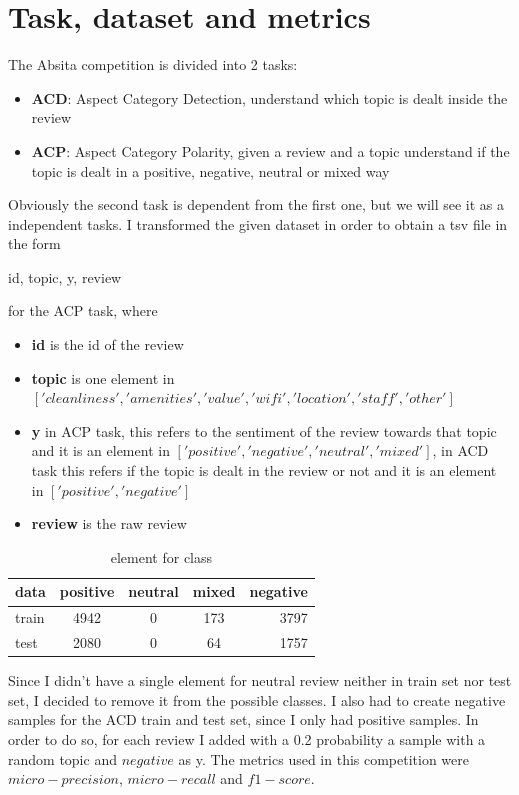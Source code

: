 \documentclass{article}
\begin{document}
    \section{Task, dataset and metrics}\label{sec:s1}
        The Absita competition is divided into 2 tasks:
        \begin{itemize}
            \item \textbf{ACD}: Aspect Category Detection, understand which topic is dealt inside the review
            \item \textbf{ACP}: Aspect Category Polarity, given a review and a topic understand if the topic is dealt in a positive, negative, neutral or mixed way
        \end{itemize}
        Obviously the second task is dependent from the first one, but we will see it as a independent tasks.
        I transformed the given dataset in order to obtain a tsv file in the form
        \\\centerline{id, topic, y, review}
        for the ACP task, where
        \begin{itemize}
            \item \textbf{id} is the id of the review
            \item \textbf{topic} is one element in $['cleanliness', 'amenities', 'value', 'wifi', 'location', 'staff', 'other']$
            \item \textbf{y} in ACP task, this refers to the sentiment of the review towards that topic and it is an element in $['positive', 'negative', 'neutral', 'mixed']$, in ACD task this refers if the topic is dealt in the review or not and it is an element in $['positive', 'negative']$
            \item \textbf{review} is the raw review
        \end{itemize}
        \begin{table}[h!]
            \begin{center}
                \caption{element for class}
                \label{tab:table1}
                \begin{tabular}{l|c|c|c|r}
                    \textbf{data} & \textbf{positive} & \textbf{neutral} & \textbf{mixed} & \textbf{negative}\\
                    \hline
                        train & 4942 & 0 & 173 & 3797\\
                        test & 2080 & 0 & 64 & 1757\\
                \end{tabular}
            \end{center}
        \end{table}
        Since I didn't have a single element for neutral review neither in train set nor test set, I decided to remove it from the possible classes.
        I also had to create negative samples for the ACD train and test set, since I only had positive samples.
        In order to do so, for each review I added with a 0.2 probability a sample with a random topic and $negative$ as y.
        The metrics used in this competition were $micro-precision$, $micro-recall$ and $f1-score$.
\end{document}
